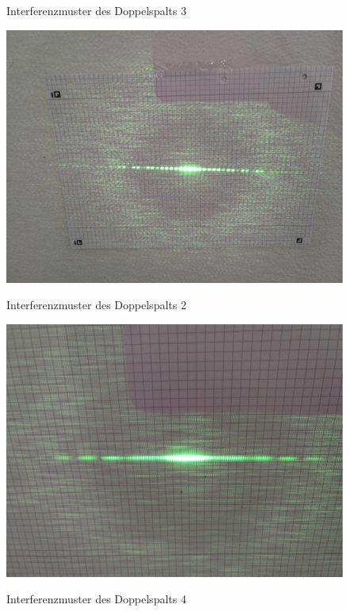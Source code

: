 \documentclass[ngerman]{scrartcl}
\begin{document}
\begin{figure}[H]
\begin{minipage}[t]{0.45\linewidth}
        \caption{Interferenzmuster des Doppelspalts 3}
        \label{fig:DS_3_interferenzmuster}
    \end{minipage}%
    \hspace*{\fill}
    \begin{minipage}[t]{0.45\linewidth}
        \centering
        \includegraphics[width=\linewidth]{fig/Compressed/DS2_0_10_25.jpg}
        \caption{Interferenzmuster des Doppelspalts 2}
        \label{fig:DS_2_interferenzmuster}
        \includegraphics[width=\linewidth]{fig/Compressed/DS4_0_11.jpg}
        \caption{Interferenzmuster des Doppelspalts 4}
        \label{fig:DS_4_interferenzmuster}
    \end{minipage}
\end{figure}
\end{document}

